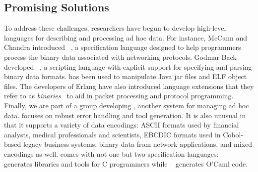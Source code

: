 \subsection{Promising Solutions}

To address these challenges, 
researchers have begun to develop high-level languages 
for describing and processing ad hoc data.  For instance,
McCann and Chandra introduced
\packettypes{}~\cite{sigcomm00}, a specification language designed to help 
programmers process the binary data associated
with networking protocols.  Godmar Back developed
\datascript{}~\cite{gpce02}, a scripting language with explicit
support for specifying and parsing binary data formats. \datascript{}
has been used to manipulate Java jar files and ELF object files.  The
developers of Erlang have also introduced language extensions that
they refer to as {\em binaries}~\cite{erlang-bits,gustafsson+:binaries} 
to aid in packet
processing and protocol programming.
Finally, we are part of a group developing
\pads{}, another system for managing ad hoc data.
\pads{} focuses on robust error handling and tool generation.
It is also unusual in that it supports a variety of data encodings:
ASCII formats used by financial analysts, medical professionals and scientists,
EBCDIC formats used in Cobol-based legacy business systems,
binary data from network applications, and mixed encodings as well.
\pads{} comes with not one but two specification languages: 
\padsc{}~\cite{fisher+:pads} generates
libraries and tools for C programmers while \padsml~\cite{mandelbaum+:padsml}
generates O'Caml code.



